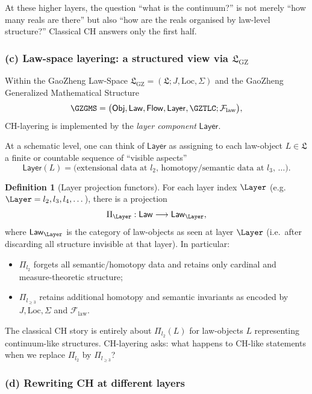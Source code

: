 \documentclass[11pt]{book}
\theoremstyle{plain}
\theoremstyle{definition}
\newtheorem{definition}[theorem]{Definition} \theoremstyle{remark}
\newcommand{\GZLS}{\ensuremath{\mathfrak{L}_{\mathrm{GZ}}}}       \newcommand{\GZLT}{\ensuremath{M_{!w}}}                           \newcommand{\GZLOC}{\ensuremath{A_M}}                             \newcommand{\GZLCurv}{\ensuremath{\mathcal{F}_{\mathrm{law}}}}
\begin{document}
At these higher layers, the question “what is the continuum?” is not
merely “how many reals are there” but also “how are the reals
organised by law-level structure?” Classical CH answers only the first
half.



\subsubsection*{(c) Law-space layering: a structured view via \texorpdfstring{\GZLS}{GZ-LS}}

Within the GaoZheng Law-Space $\GZLS=(\mathfrak{L};J,\mathrm{Loc},\Sigma)$
and the GaoZheng Generalized Mathematical Structure
\[
  \GZGMS =
  \bigl(
    \mathsf{Obj},\mathsf{Law},\mathsf{Flow},\mathsf{Layer},
    \GZTLC;\GZLCurv
  \bigr),
\]
CH-layering is implemented by the \emph{layer component}
$\mathsf{Layer}$.

At a schematic level, one can think of $\mathsf{Layer}$ as assigning to
each law-object $L\in\mathfrak{L}$ a finite or countable sequence of
“visible aspects”
\[
  \mathsf{Layer}(L)
  =
  \bigl(
    \text{extensional data at }l_2,\,
    \text{homotopy/semantic data at }l_3,\,
    \dots
  \bigr).
\]

\begin{definition}[Layer projection functors]
  For each layer index $\Layer$ (e.g.\ $\Layer=l_2,l_3,l_4,\dots$),
  there is a projection
  \[
    \Pi_\Layer :
      \mathsf{Law} \longrightarrow \mathsf{Law}_\Layer,
  \]
  where $\mathsf{Law}_\Layer$ is the category of law-objects as seen
  at layer $\Layer$ (i.e.\ after discarding all structure invisible at
  that layer). In particular:
  \begin{itemize}
    \item $\Pi_{l_2}$ forgets all semantic/homotopy data and retains
          only cardinal and measure-theoretic structure;
    \item $\Pi_{l_{\ge3}}$ retains additional homotopy and semantic
          invariants as encoded by $J,\mathrm{Loc},\Sigma$ and
          \GZLCurv.
  \end{itemize}
\end{definition}

The classical CH story is entirely about $\Pi_{l_2}(L)$ for law-objects
$L$ representing continuum-like structures. CH-layering asks: what
happens to CH-like statements when we replace $\Pi_{l_2}$ by
$\Pi_{l_{\ge3}}$?



\subsubsection*{(d) Rewriting CH at different layers}
\end{document}
